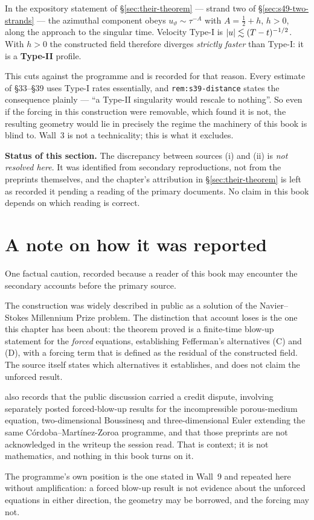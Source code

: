 \begin{obsv}
\label{obs:s49-typeII}
In the expository statement of \S\ref{sec:their-theorem} --- strand two of
\S\ref{sec:s49-two-strands} --- the azimuthal
component obeys \(u_\vartheta\sim\tau^{-A}\) with \(A=\tfrac12+h\), \(h>0\),
along the approach to the singular time. Velocity Type-I is
\(\left|u\right|\lesssim(T-t)^{-1/2}\). With \(h>0\) the constructed field therefore
diverges \emph{strictly faster} than Type-I: it is a \textbf{Type-II} profile.

This cuts against the programme and is recorded for that reason. Every
estimate of \S33--\S39 uses Type-I rates essentially, and
\texttt{rem:s39-distance} states the consequence plainly --- ``a Type-II
singularity would rescale to nothing''. So even if the forcing in this
construction were removable, which  found it is not, the resulting
geometry would lie in precisely the regime the machinery of this book is
blind to. Wall~3 is not a technicality; this is what it excludes.
\end{obsv}

\begin{record}
\textbf{Status of this section.} The discrepancy between sources (i) and
(ii) is \emph{not resolved here}. It was identified from secondary
reproductions, not from the preprints themselves, and the chapter's
attribution in \S\ref{sec:their-theorem} is left as  recorded it
pending a reading of the primary documents. No claim in this book depends on
which reading is correct.
\end{record}

\section{A note on how it was reported}
\label{sec:reporting}

One factual caution, recorded because a reader of this book may encounter the
secondary accounts before the primary source.

The construction was widely described in public as a solution of the
Navier--Stokes Millennium Prize problem. The distinction that account loses is
the one this chapter has been about: the theorem proved is a finite-time
blow-up statement for the \emph{forced} equations, establishing Fefferman's
alternatives (C) and (D), with a forcing term that is defined as the residual
of the constructed field. The source itself states which alternatives it
establishes, and does not claim the unforced result.

 also records that the public discussion carried a credit dispute,
involving separately posted forced-blow-up results for the incompressible
porous-medium equation, two-dimensional Boussinesq and three-dimensional Euler
extending the same C\'ordoba--Mart\'inez-Zoroa programme, and that those
preprints are not acknowledged in the writeup the session read. That is
context; it is not mathematics, and nothing in this book turns on it.

The programme's own position is the one stated in Wall~9 and repeated here
without amplification: a forced blow-up result is not evidence about the
unforced equations in either direction, the geometry may be borrowed, and the
forcing may not.
